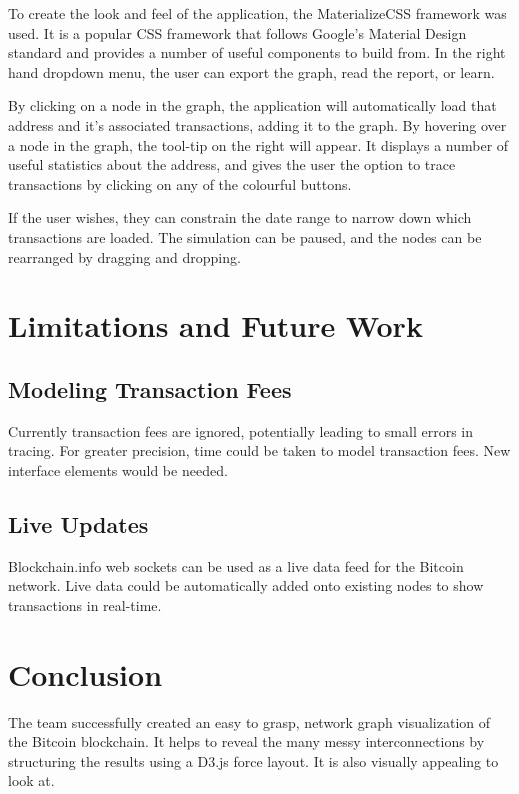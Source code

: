 \documentclass{article}
\begin{document}
To create the look and feel of the application, the MaterializeCSS framework was used. It is a popular CSS framework that follows Google's Material Design standard \cite{materializeabout} and provides a number of useful components to build from. In the right hand dropdown menu, the user can export the graph, read the report, or learn.

By clicking on a node in the graph, the application will automatically load that address and it's associated transactions, adding it to the graph. By hovering over a node in the graph, the tool-tip on the right will appear. It displays a number of useful statistics about the address, and gives the user the option to trace transactions by clicking on any of the colourful buttons.

If the user wishes, they can constrain the date range to narrow down which transactions are loaded. The simulation can be paused, and the nodes can be rearranged by dragging and dropping.

\section{Limitations and Future Work}

\subsection{Modeling Transaction Fees}

Currently transaction fees are ignored, potentially leading to small errors in tracing. For greater precision, time could be taken to model transaction fees. New interface elements would be needed.

\subsection{Live Updates}

Blockchain.info web sockets can be used as a live data feed for the Bitcoin network. Live data could be automatically added onto existing nodes to show transactions in real-time.

\section{Conclusion}

The team successfully created an easy to grasp, network graph visualization of the Bitcoin blockchain. It helps to reveal the many messy interconnections by structuring the results using a D3.js force layout. It is also visually appealing to look at.
\end{document}
